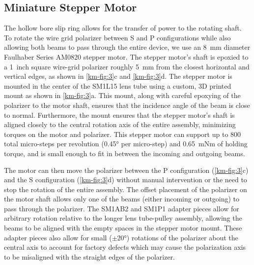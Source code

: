 \subsection{Miniature Stepper Motor}
\label{km-sec:stepper}
The hollow bore slip ring allows for the transfer of power to the rotating shaft.
To rotate the wire grid polarizer between S and P configurations while also allowing both beams to pass through the entire device, we use an \qty{8}{mm} diameter Faulhaber Series AM0820 stepper motor.
The stepper motor's shaft is epoxied to a \qty{1}{inch} square wire-grid polarizer roughly \qty{5}{mm} from the closest horizontal and vertical edges, as shown in \cref{km-fig:3}c and \cref{km-fig:3}d.
The stepper motor is mounted in the center of the SM1L15 lens tube using a custom, 3D printed mount as shown in \cref{km-fig:3}a. 
This mount, along with careful epoxying of the polarizer to the motor shaft, ensures that the incidence angle of the beam is close to normal.
Furthermore, the mount ensures that the stepper motor's shaft is aligned closely to the central rotation axis of the entire assembly, minimizing torques on the motor and polarizer.
This stepper motor can support up to \num{800} total micro-steps per revolution (\ang{0.45} per micro-step) and \qty{0.65}{mNm} of holding torque, and is small enough to fit in between the incoming and outgoing beams. 

The motor can then move the polarizer between the P configuration (\cref{km-fig:3}c) and the S configuration (\cref{km-fig:3}d) without manual intervention or the need to stop the rotation of the entire assembly.
The offset placement of the polarizer on the motor shaft allows only one of the beams (either incoming or outgoing) to pass through the polarizer.
The SM1AB2 and SM1P1 adapter pieces allow for arbitrary rotation relative to the longer lens tube-pulley assembly, allowing the beams to be aligned with the empty spaces in the stepper motor mount.
These adapter pieces also allow for small ($\pm \ang{20}$) rotations of the polarizer about the central axis to account for factory defects which may cause the polarization axis to be misaligned with the straight edges of the polarizer.

